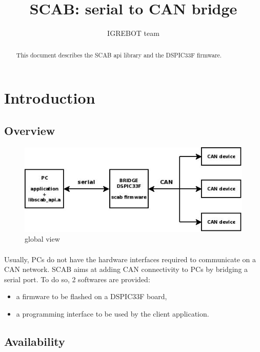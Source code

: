 \documentclass[a4paper, 11pt]{article}
\begin{document}
\title{SCAB: serial to CAN bridge}
\author{IGREBOT team}
\date{}

\maketitle


\newpage
\tableofcontents
{}


\newpage
\begin{abstract}
This document describes the SCAB api library and the DSPIC33F firmware.
\end{abstract}


\newpage
\section{Introduction}

\subsection{Overview}
\begin{figure}[]
\centering
\includegraphics[scale=0.5]{./dia/scab_network/main.jpeg}
\caption{global view}
\label{global_view}
\end{figure}

\paragraph{}
Usually, PCs do not have the hardware interfaces required to communicate on a
CAN network. SCAB aims at adding CAN connectivity to PCs by bridging a serial
port. To do so, 2 softwares are provided:
\begin{itemize}
\item a firmware to be flashed on a DSPIC33F board,
\item a programming interface to be used by the client application.
\end{itemize}

\subsection{Availability}
\end{document}

